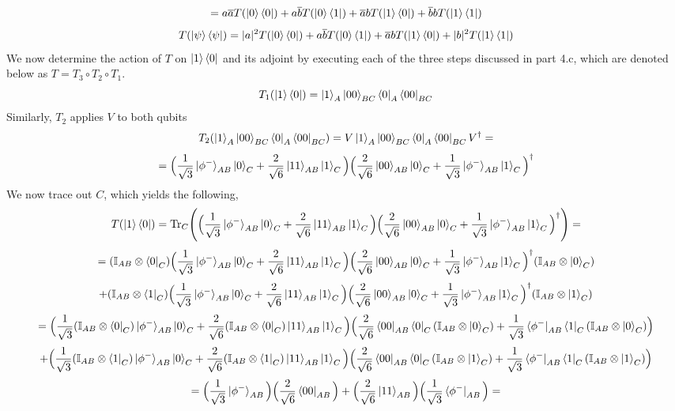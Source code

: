 \documentclass[12pt]{article}
\begin{document}
\begin{enumerate}
\begin{enumerate}
$$ = a\overline{a} T(\ket{0} \bra{0}) + a \overline{b} T(\ket{0} \bra{1}) + \overline{a} b T(\ket{1} \bra{0}) + \overline{b} b T(\ket{1} \bra{1}) $$
$$ T(\ket{\psi} \bra{\psi}) = |a|^2 T(\ket{0} \bra{0}) + a \overline{b} T(\ket{0} \bra{1}) + \overline{a} b T(\ket{1} \bra{0}) + |b|^2 T(\ket{1} \bra{1}) $$
We now determine the action of $T$ on $\ket{1} \bra{0}$ and its adjoint by executing each of the three steps discussed in part 4.c, which are denoted below as $T = T_3\circ T_2 \circ T_1$.
$$ T_1(\ket{1} \bra{0}) = \ket{1}_A \ket{00}_{BC} \bra{0}_A \bra{00}_{BC} $$
Similarly, $T_2$ applies $V$ to both qubits
$$ T_2(\ket{1}_A \ket{00}_{BC} \bra{0}_A \bra{00}_{BC}) = V\ket{1}_A \ket{00}_{BC} \bra{0}_A \bra{00}_{BC} V^\dagger = $$
$$ = \Big(\frac{1}{\sqrt{3}}\ket{\phi^-}_{AB} \ket{0}_C + \frac{2}{\sqrt{6}} \ket{11}_{AB}\ket{1}_C
\Big)\Big( \frac{2}{\sqrt{6}} \ket{00}_{AB}\ket{0}_C +
\frac{1}{\sqrt{3}}\ket{\phi^-}_{AB} \ket{1}_C \Big)^\dagger
 $$
We now trace out $C$, which yields the following,
$$T(\ket{1} \bra{0}) = \mathrm{Tr}_C \Bigg( \Big(\frac{1}{\sqrt{3}}\ket{\phi^-}_{AB} \ket{0}_C + \frac{2}{\sqrt{6}} \ket{11}_{AB}\ket{1}_C
\Big)\Big( \frac{2}{\sqrt{6}} \ket{00}_{AB}\ket{0}_C +
\frac{1}{\sqrt{3}}\ket{\phi^-}_{AB} \ket{1}_C \Big)^\dagger \Bigg) = $$
$$ = (\mathbb{I}_{AB}\otimes\bra{0}_C) \Big(\frac{1}{\sqrt{3}}\ket{\phi^-}_{AB} \ket{0}_C + \frac{2}{\sqrt{6}} \ket{11}_{AB}\ket{1}_C
\Big)\Big( \frac{2}{\sqrt{6}} \ket{00}_{AB}\ket{0}_C +
\frac{1}{\sqrt{3}}\ket{\phi^-}_{AB} \ket{1}_C \Big)^\dagger  (\mathbb{I}_{AB}\otimes\ket{0}_C)$$
$$ + (\mathbb{I}_{AB}\otimes\bra{1}_C) \Big(\frac{1}{\sqrt{3}}\ket{\phi^-}_{AB} \ket{0}_C + \frac{2}{\sqrt{6}} \ket{11}_{AB}\ket{1}_C
\Big)\Big( \frac{2}{\sqrt{6}} \ket{00}_{AB}\ket{0}_C +
\frac{1}{\sqrt{3}}\ket{\phi^-}_{AB} \ket{1}_C \Big)^\dagger  (\mathbb{I}_{AB}\otimes\ket{1}_C) $$
$$ = \Big(\frac{1}{\sqrt{3}}(\mathbb{I}_{AB}\otimes\bra{0}_C) \ket{\phi^-}_{AB} \ket{0}_C + \frac{2}{\sqrt{6}} (\mathbb{I}_{AB}\otimes\bra{0}_C) \ket{11}_{AB}\ket{1}_C
\Big) \Big( \frac{2}{\sqrt{6}} \bra{00}_{AB}\bra{0}_C (\mathbb{I}_{AB}\otimes\ket{0}_C) +
\frac{1}{\sqrt{3}}\bra{\phi^-}_{AB} \bra{1}_C (\mathbb{I}_{AB}\otimes\ket{0}_C) \Big)$$
$$ + \Big(\frac{1}{\sqrt{3}}(\mathbb{I}_{AB}\otimes\bra{1}_C) \ket{\phi^-}_{AB} \ket{0}_C + \frac{2}{\sqrt{6}} (\mathbb{I}_{AB}\otimes\bra{1}_C) \ket{11}_{AB}\ket{1}_C
\Big)\Big( \frac{2}{\sqrt{6}} \bra{00}_{AB}\bra{0}_C (\mathbb{I}_{AB}\otimes\ket{1}_C) +
\frac{1}{\sqrt{3}}\bra{\phi^-}_{AB} \bra{1}_C (\mathbb{I}_{AB}\otimes\ket{1}_C) \Big)  $$
$$ = \Big(
\frac{1}{\sqrt{3}}\ket{\phi^-}_{AB}
\Big) \Big( \frac{2}{\sqrt{6}} \bra{00}_{AB} \Big) + \Big(\frac{2}{\sqrt{6}} \ket{11}_{AB}\Big)\Big( \frac{1}{\sqrt{3}}\bra{\phi^-}_{AB} \Big) = 
$$
\end{enumerate}
\end{enumerate}
\end{document}

